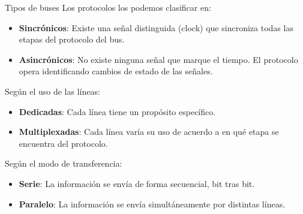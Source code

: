 \documentclass[aspectratio=169]{beamer}
\begin{document}
\begin{frame}[fragile]{Tipos de buses}
    Los \textcolor{naranjauca}{protocolos} los podemos clasificar en:
    \begin{itemize}
    \item \textbf{Sincrónicos}: Existe una señal distinguida (clock) que sincroniza todas las etapas del protocolo del bus.
    \item \textbf{Asincrónicos}: No existe ninguna señal que marque el tiempo. El protocolo opera identificando cambios de estado de las señales.
    \end{itemize}
    \bigskip
    \pause
    Según el uso de las líneas:\\
    \begin{itemize}
    \item \textbf{Dedicadas}: Cada línea tiene un propósito específico.
    \item \textbf{Multiplexadas}: Cada línea varía su uso de acuerdo a en qué etapa se encuentra del protocolo.
    \end{itemize}
    \bigskip
    \pause
    Según el modo de transferencia:\\
    \begin{itemize}
    \item \textbf{Serie}: La información se envía de forma secuencial, bit tras bit.
    \item \textbf{Paralelo}: La información se envía simultáneamente por distintas líneas.
    \end{itemize}
\end{frame}
\end{document}
